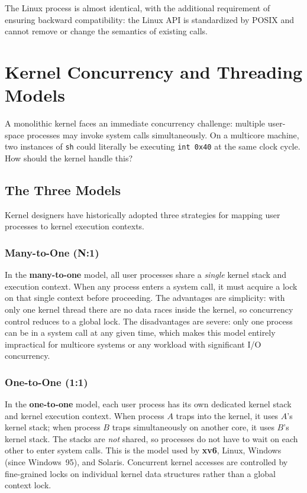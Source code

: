 \documentclass[11pt]{article}
\begin{document}
The Linux process is almost identical, with the additional requirement of ensuring backward compatibility: the Linux API is standardized by POSIX and cannot remove or change the semantics of existing calls.

\section{Kernel Concurrency and Threading Models}

A monolithic kernel faces an immediate concurrency challenge: multiple user-space processes may invoke system calls simultaneously. On a multicore machine, two instances of \texttt{sh} could literally be executing \texttt{int 0x40} at the same clock cycle. How should the kernel handle this?

\subsection{The Three Models}

Kernel designers have historically adopted three strategies for mapping user processes to kernel execution contexts.

\subsubsection*{Many-to-One (N:1)}

In the \textbf{many-to-one} model, all user processes share a \emph{single} kernel stack and execution context. When any process enters a system call, it must acquire a lock on that single context before proceeding. The advantages are simplicity: with only one kernel thread there are no data races inside the kernel, so concurrency control reduces to a global lock. The disadvantages are severe: only one process can be in a system call at any given time, which makes this model entirely impractical for multicore systems or any workload with significant I/O concurrency.

\subsubsection*{One-to-One (1:1)}

In the \textbf{one-to-one} model, each user process has its own dedicated kernel stack and kernel execution context. When process $A$ traps into the kernel, it uses $A$'s kernel stack; when process $B$ traps simultaneously on another core, it uses $B$'s kernel stack. The stacks are \emph{not} shared, so processes do not have to wait on each other to enter system calls. This is the model used by \textbf{xv6}, Linux, Windows (since Windows~95), and Solaris. Concurrent kernel accesses are controlled by fine-grained locks on individual kernel data structures rather than a global context lock.
\end{document}
